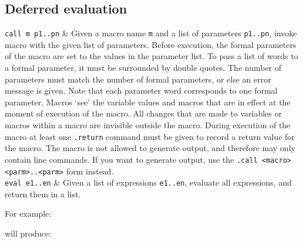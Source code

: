 \subsection{Deferred evaluation}
\begin{desctab}
{\tt call m p1..pn}
&
Given a macro name \verb+m+ and a list of parameters \verb+p1..pn+,
invoke macro with the given list of parameters.
Before execution,
the formal parameters of the macro are set to the values in the parameter list.
To pass a list of words to a formal parameter,
it must be surrounded by double quotes.
The number of parameters must match the number of formal parameters,
or else an error message is given.
Note that each parameter word corresponds to one formal parameter.
Macros `see' the variable values and macros that are in effect at the moment
of execution of the macro.
All changes that are made to variables or macros within a macro
are invisible outside the macro.
During execution of the macro at least one \verb+.return+ command must be
given to record a return value for the macro.
The macro is not allowed to generate output, and therefore may only contain
line commands.
If you want to generate output, 
use the \verb+.call <macro> <parm>..<parm>+ form instead.
\\
{\tt eval e1..en}
&
Given a list of expressions \verb+e1..en+, evaluate all expressions,
and return them in a list.
\\
\end{desctab}
For example:
\begin{showfile}

\end{showfile}
will produce:
\begin{showfile}

\end{showfile}
